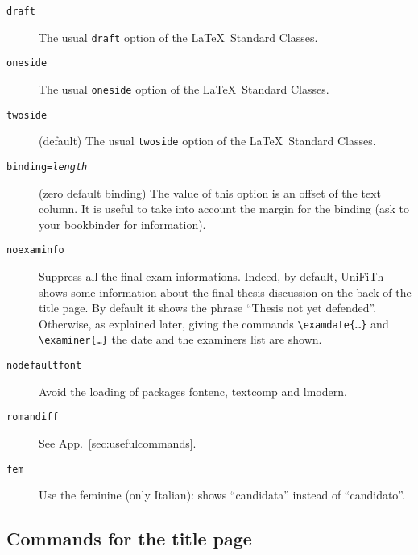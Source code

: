 \documentclass[a5paper,11pt]{article}
\newcommand{\bs}{\textbackslash}
\begin{document}
\begin{description}

\item[\texttt{draft}] The usual \texttt{draft} option of the \LaTeX\ Standard Classes.
\item[\texttt{oneside}] The usual \texttt{oneside} option of the \LaTeX\ Standard Classes.
\item[\texttt{twoside}] (default) The usual \texttt{twoside} option of the \LaTeX\ Standard Classes.

\item[\texttt{binding=\textsl{length}}] (zero default binding)
The value of this option is an offset of the text column.
It is useful to take into account the margin for the binding (ask to your bookbinder for information).
\item[\texttt{noexaminfo}] Suppress all the final exam informations. Indeed, by default, \textsf{UniFiTh} shows some information about the final thesis discussion on the back of the title page. By default it shows the phrase ``Thesis not yet defended''. Otherwise, as explained later, giving the commands 
\texttt{\bs examdate\{\dots\}} and \texttt{\bs examiner\{\dots\}} the date and
the examiners list are shown.
\item[\texttt{nodefaultfont}] Avoid the loading of packages \textsf{fontenc}, \textsf{textcomp} and \textsf{lmodern}.
\item[\texttt{romandiff}] See App.~\ref{sec:usefulcommands}.
\item[\texttt{fem}] Use the feminine (only Italian): shows ``candidata'' instead of ``candidato''.
\end{description}

\subsection[Commands for the\\ title page]{Commands for the title page}
\label{commands_titlepage}
\end{document}
